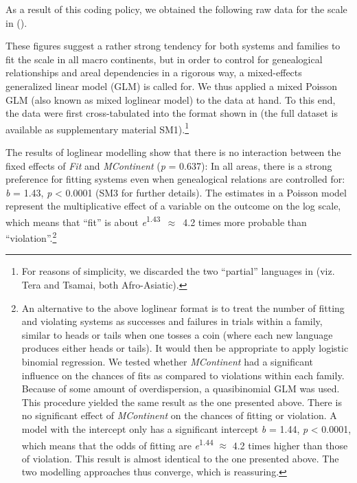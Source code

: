 \documentclass[output=paper]{langscibook}
\begin{document}
As a result of this coding policy, we obtained the following raw data for the scale in  ().


These figures suggest a rather strong tendency for both systems and families to fit the scale in all macro continents, but in order to control for genealogical relationships and areal dependencies in a rigorous way, a mixed-effects generalized linear model (GLM) is called for. We thus applied a mixed Poisson GLM (also known as mixed loglinear model) to the data at hand. To this end, the data were first cross-tabulated into the format shown in  (the full dataset is available as supplementary material SM1).\footnote{For reasons of simplicity, we discarded the two “partial” languages in  (viz. Tera and Tsamai, both Afro-Asiatic).}


The results of loglinear modelling show that there is no interaction between the fixed effects of \textit{Fit} and \textit{MContinent} (\textit{p} = 0.637): In all areas, there is a strong preference for fitting systems even when genealogical relations are controlled for: \textit{b} = 1.43, \textit{p} < 0.0001 (\cf SM3 for further details). The estimates in a Poisson model represent the multiplicative effect of a variable on the outcome on the log scale, which means that “fit” is about \mbox{\textit{e}\textsuperscript{1.43} ${\approx}$ 4.2} times more probable than “violation”.\footnote{An alternative to the above loglinear format is to treat the number of fitting and violating systems as successes and failures in trials within a family, similar to heads or tails when one tosses a coin (where each new language produces either heads or tails). It would then be appropriate to apply logistic binomial regression. We tested whether \textit{MContinent} had a significant influence on the chances of fits as compared to violations within each family. Because of some amount of overdispersion, a quasibinomial GLM was used. This procedure yielded the same result as the one presented above. There is no significant effect of \textit{MContinent} on the chances of fitting or violation. A model with the intercept only has a significant intercept \textit{b} = 1.44, \textit{p} < 0.0001, which means that the odds of fitting are \textit{e}\textsuperscript{1.44} ${\approx}$ 4.2 times higher than those of violation. This result is almost identical to the one presented above. The two modelling approaches thus converge, which is reassuring.}
\end{document}

